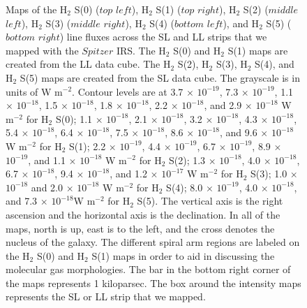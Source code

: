 \documentclass[manuscript]{aastex}
\begin{document}
\clearpage


\begin{figure}
 \end{figure}
 \clearpage
 
 \begin{figure}
 \caption{Maps of the H$_2$ S(0) ($top$ $left$), H$_2$ S(1)
 ($top$ $right$), H$_2$ S(2) ($middle$ $left$), H$_2$ S(3) 
 ($middle$ $right$), H$_2$ S(4) ($bottom$ $left$), and H$_2$ 
 S(5) ($bottom$ $right$) line fluxes across the SL and LL strips that we mapped 
 with the $Spitzer$ IRS.  The H$_2$ S(0) and H$_2$ S(1) 
 maps are created from the LL data cube.    
The H$_2$ S(2), H$_2$ S(3), H$_2$ S(4), and 
H$_2$ S(5) maps are created from the SL data cube.  
The grayscale is in units of W $\mathrm{m^{-2}}$.  Contour levels are at 
3.7 $\times$ ${10^{-19}}$, 7.3 $\times$ ${10^{-19}}$, 1.1 $\times$ ${10^{-18}}$, 1.5 $\times$ ${10^{-18}}$, 1.8 $\times$ ${10^{-18}}$, 2.2 $\times$ ${10^{-18}}$, and 2.9 $\times$ ${10^{-18}}$ W $\mathrm{m^{-2}}$ for H$_2$ S(0); 
1.1 $\times$ ${10^{-18}}$, 2.1 $\times$ ${10^{-18}}$, 3.2 $\times$ ${10^{-18}}$, 4.3 $\times$ ${10^{-18}}$, 5.4 $\times$ ${10^{-18}}$, 6.4 $\times$ ${10^{-18}}$, 7.5 $\times$ ${10^{-18}}$, 8.6 $\times$ ${10^{-18}}$, and 9.6 $\times$ ${10^{-18}}$ W $\mathrm{m^{-2}}$ for H$_2$ S(1); 
2.2 $\times$ ${10^{-19}}$, 4.4 $\times$ ${10^{-19}}$,  6.7 $\times$ ${10^{-19}}$, 8.9 $\times$ ${10^{-19}}$, and 1.1 $\times$ ${10^{-18}}$ W $\mathrm{m^{-2}}$ for H$_2$ S(2);
1.3 $\times$ ${10^{-18}}$, 4.0 $\times$ ${10^{-18}}$, 6.7 $\times$ ${10^{-18}}$, 9.4 $\times$ ${10^{-18}}$, and 1.2 $\times$ ${10^{-17}}$ W $\mathrm{m^{-2}}$ for H$_2$ S(3);  
1.0 $\times$ ${10^{-18}}$ and 2.0 $\times$ ${10^{-18}}$ W $\mathrm{m^{-2}}$ for H$_2$ S(4); 
8.0 $\times$ ${10^{-19}}$, 4.0 $\times$ ${10^{-18}}$, and 7.3 $\times$ ${10^{-18}}$W $\mathrm{m^{-2}}$ for H$_2$ S(5).  
The vertical axis is the right ascension and the horizontal axis is the declination.  
In all of the maps, north is up, east is to the left, and the cross 
denotes the nucleus of the galaxy.  The different spiral 
arm regions are labeled on the H$_2$ S(0) and H$_2$ S(1) 
maps in order to aid in discussing the molecular gas morphologies.  
The bar in the bottom right corner of the maps 
represents 1 kiloparsec.  The box around 
the intensity maps represents the SL or LL strip that we mapped.}
  \label{figure-2}
  \end{figure}
\end{document}
